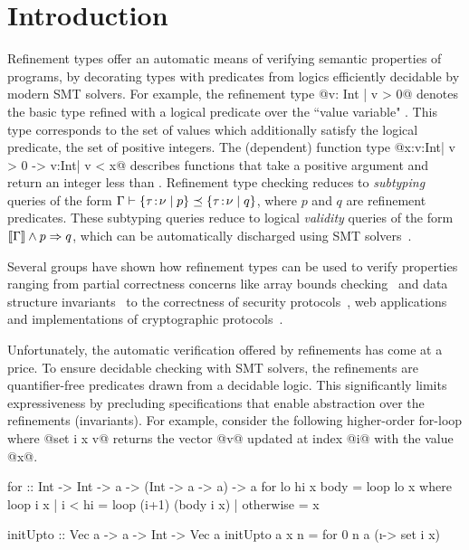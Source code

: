 
\section{Introduction}\label{sec:intro}

Refinement types offer an automatic means 
of verifying semantic properties of programs, 
by decorating types with predicates from logics 
efficiently decidable by modern SMT solvers.
For example, the refinement type 
@{v: Int | v > 0}@
denotes the basic type  refined with a logical
predicate over the ``value variable" .
This type corresponds to the set of  values 
 which additionally satisfy the logical predicate, 
\ie the set of positive integers.  
The (dependent) function type 
@x:{v:Int| v > 0} -> {v:Int| v < x}@
describes functions that take a positive argument 
 and return an integer less than .
%
Refinement type checking reduces to \emph{subtyping} queries 
of the form ${{{\Gamma} \vdash {\{ {{{\tau}}\!:\!{{\nu}}} \mid {p}\}} \preceq {\{ {{{\tau}}\!:\!{{\nu}}} \mid {q}\}}}}$,
where $p$ and $q$ are refinement predicates. 
These subtyping queries reduce to logical \emph{validity} 
queries of the form
${[\![\Gamma]\!] \wedge p \Rightarrow q}$, which can be 
automatically discharged using SMT solvers~\cite{z3}. 
 
Several groups have shown how refinement types 
can be used to verify properties ranging from partial 
correctness concerns like array bounds 
checking~\cite{pfenningxi98,LiquidPLDI08} and data structure
invariants~\cite{LiquidPLDI09} to the correctness of security
protocols~\cite{GordonTOPLAS2011}, web applications 
\cite{SwamyOAKLAND11} and implementations of cryptographic 
protocols~\cite{FournetCCS11}. 

Unfortunately, the automatic verification 
offered by refinements has come at a price. 
To ensure decidable checking with SMT solvers, the 
refinements are quantifier-free predicates drawn from a
decidable logic.  This significantly limits expressiveness by 
precluding specifications that enable abstraction over the 
refinements (\ie invariants). For example, consider the 
following higher-order for-loop where @set i x v@ returns 
the vector @v@ updated at index @i@ with the value @x@. 

\begin{code}
     for :: Int -> Int -> a -> (Int -> a -> a) -> a
     for lo hi x body      = loop lo x 
       where loop i x 
               | i < hi    = loop (i+1) (body i x)
               | otherwise = x
     
     initUpto :: Vec a -> a -> Int -> Vec a 
     initUpto a x n = for 0 n a (\i -> set i x) 
\end{code}

